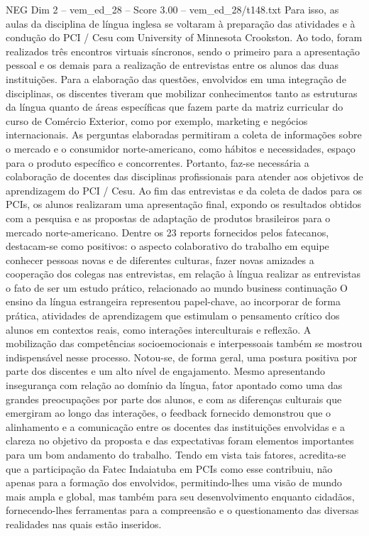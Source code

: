 \begin{textsample}{NEG Dim 2 – vem\_ed\_28 – Score 3.00 – vem\_ed\_28/t148.txt}
Para isso, as aulas da disciplina de língua inglesa se voltaram à preparação das atividades e à condução do PCI / Cesu com University of Minnesota Crookston.
Ao todo, foram realizados três encontros virtuais síncronos, sendo o primeiro para a apresentação pessoal e os demais para a realização de entrevistas entre os alunos das duas instituições.
Para a elaboração das questões, envolvidos em uma integração de disciplinas, os discentes tiveram que mobilizar conhecimentos tanto as estruturas da língua quanto de áreas específicas que fazem parte da matriz curricular do curso de Comércio Exterior, como por exemplo, marketing e negócios internacionais.
As perguntas elaboradas permitiram a coleta de informações sobre o mercado e o consumidor norte-americano, como hábitos e necessidades, espaço para o produto específico e concorrentes.
Portanto, faz-se necessária a colaboração de docentes das disciplinas profissionais para atender aos objetivos de aprendizagem do PCI / Cesu.
Ao fim das entrevistas e da coleta de dados para os PCIs, os alunos realizaram uma apresentação final, expondo os resultados obtidos com a pesquisa e as propostas de adaptação de produtos brasileiros para o mercado norte-americano.
Dentre os 23 reports fornecidos pelos fatecanos, destacam-se como positivos: o aspecto colaborativo do trabalho em equipe conhecer pessoas novas e de diferentes culturas, fazer novas amizades a cooperação dos colegas nas entrevistas, em relação à língua realizar as entrevistas o fato de ser um estudo prático, relacionado ao mundo business continuação O ensino da língua estrangeira representou papel-chave, ao incorporar de forma prática, atividades de aprendizagem que estimulam o pensamento crítico dos alunos em contextos reais, como interações interculturais e reflexão.
A mobilização das competências socioemocionais e interpessoais também se mostrou indispensável nesse processo.
Notou-se, de forma geral, uma postura positiva por parte dos discentes e um alto nível de engajamento.
Mesmo apresentando insegurança com relação ao domínio da língua, fator apontado como uma das grandes preocupações por parte dos alunos, e com as diferenças culturais que emergiram ao longo das interações, o feedback fornecido demonstrou que o alinhamento e a comunicação entre os docentes das instituições envolvidas e a clareza no objetivo da proposta e das expectativas foram elementos importantes para um bom andamento do trabalho.
Tendo em vista tais fatores, acredita-se que a participação da Fatec Indaiatuba em PCIs como esse contribuiu, não apenas para a formação dos envolvidos, permitindo-lhes uma visão de mundo mais ampla e global, mas também para seu desenvolvimento enquanto cidadãos, fornecendo-lhes ferramentas para a compreensão e o questionamento das diversas realidades nas quais estão inseridos.

\end{textsample}
